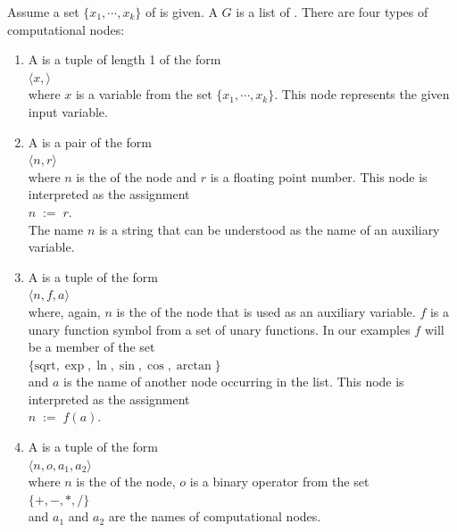 \begin{Definition}
  Assume a set $\{x_1, \cdots, x_k \}$ of  is given.
  A   $G$ is a list of .
    There are four types of computational nodes:
  \begin{enumerate}
  \item A  is a tuple of length 1 of the form
        \\[0.2cm]
        \hspace*{1.3cm}
        $\langle x, \rangle$
        \\[0.2cm]
        where $x$ is a variable from the set $\{x_1,\cdots,x_k\}$.
        This node represents the given input variable.
  \item A  is a pair of the form
        \\[0.2cm]
        \hspace*{1.3cm}
        $\langle n, r\rangle$
        \\[0.2cm]
        where $n$ is the  of the node and $r$ is a floating point number.  This node is interpreted
        as the assignment
        \\[0.2cm]
        \hspace*{1.3cm}
        $n \;\mathtt{:=}\; r$.
        \\[0.2cm]
        The name $n$ is a string that can be understood as the name of an auxiliary variable.
  \item A  is a tuple of the form
        \\[0.2cm]
        \hspace*{1.3cm}
        $\langle n, f, a\rangle$
        \\[0.2cm]
        where, again, $n$ is the  of the node that is used as an auxiliary variable. $f$ is a unary
        function symbol from a set of unary functions.  In our examples $f$ will be a member of the set
        \\[0.2cm]
        \hspace*{1.3cm}
        $\{ \mathrm{sqrt}, \exp, \ln, \sin, \cos, \arctan \}$
        \\[0.2cm]
        and $a$ is the name of another node occurring in the list.  This node is interpreted as the assignment
        \\[0.2cm]
        \hspace*{1.3cm}
        $n \;\mathtt{:=}\; f(a)$.        
  \item A  is a tuple of the form
        \\[0.2cm]
        \hspace*{1.3cm}
        $\langle n, o, a_1, a_2\rangle$
        \\[0.2cm]
        where $n$ is the  of the node, $o$ is a binary operator from the set
        \\[0.2cm]
        \hspace*{1.3cm}
        $\{ +, -, *, / \}$
        \\[0.2cm]
        and $a_1$ and $a_2$ are the names of computational nodes.
        

\end{enumerate}
\end{Definition}
